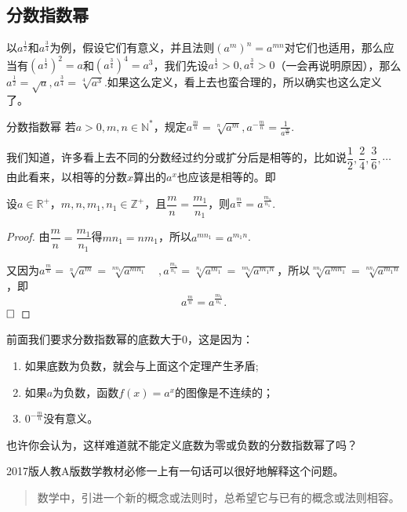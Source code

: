 \documentclass[lang=cn,math=cm,chinesefont=nofont,11pt,scheme=chinese,twocol]{elegantbook}
\begin{document}
\subsection{分数指数幂}

以$a^\frac{1}{2}$和$a^\frac34$为例，假设它们有意义，并且法则$(a^m)^n=a^{mn}$对它们也适用，那么应当有$(a^\frac{1}{2})^2=a$和$(a^\frac34)^4=a^3$，我们先设$a^\frac{1}{2}>0,a^\frac34>0$（一会再说明原因），那么$a^\frac{1}{2}=\sqrt{a},a^\frac34=\sqrt[4]{a^3}$.如果这么定义，看上去也蛮合理的，所以确实也这么定义了。

\begin{definition}{分数指数幂}
  若$a>0,m,n\in\mathbb{N}^*$，规定$a^\frac mn=\sqrt[n]{a^m},a^{-\frac mn}=\frac1{a^\frac mn}$.
\end{definition}

我们知道，许多看上去不同的分数经过约分或扩分后是相等的，比如说$\dfrac12,\dfrac24,\dfrac36,\cdots$由此看来，以相等的分数$x$算出的$a^x$也应该是相等的。即

\begin{theorem}\label{ExponentTheorem1}
  设$a\in\mathbb{R}^+$，$m,n,m_1,n_1\in\mathbb{Z}^+$，且$\dfrac mn=\dfrac{m_1}{n_1}$，则$a^{\frac mn}=a^\frac{m_1}{n_1}$.
\end{theorem}

\begin{proof}
  由$\dfrac mn=\dfrac{m_1}{n_1}$得$mn_1=nm_1$，所以$a^{mn_1}=a^{m_1n}$.

  又因为$a^{\frac mn}=\sqrt[n]{a^m}=\sqrt[nn_1]{a^{mn_1}}\quad ,a^{\frac{m_1}{n_1}}=\sqrt[n_1]{a^{m_1}}=\sqrt[nn_1]{a^{m_1n}}$，所以$\sqrt[nn_1]{a^{mn_1}}=\sqrt[nn_1]{a^{m_1n}}$，即$$a^{\frac mn}=a^{\frac{m_1}{n_1}}.$$ $\hfill\square$
\end{proof}

前面我们要求分数指数幂的底数大于$0$，这是因为：

\begin{enumerate}
  \item 如果底数为负数，就会与上面这个定理产生矛盾;
  \item 如果$a$为负数，函数$f(x)=a^x$的图像是不连续的；
  \item $0^{-\frac{m}{n}}$没有意义。
\end{enumerate}

也许你会认为，这样难道就不能定义底数为零或负数的分数指数幂了吗？

2017版人教A版数学教材必修一上有一句话可以很好地解释这个问题。

\begin{quotation}
  数学中，引进一个新的概念或法则时，总希望它与已有的概念或法则相容。
\end{quotation}
\end{document}
